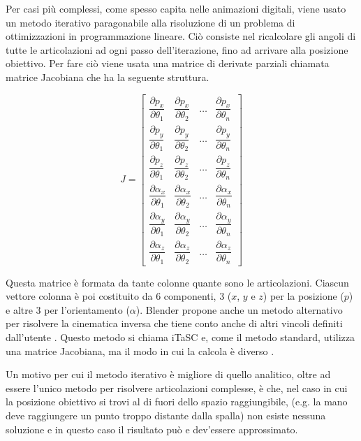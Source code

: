 Per casi più complessi, come spesso capita nelle animazioni digitali, viene usato un metodo iterativo paragonabile alla risoluzione di un problema di ottimizzazioni in programmazione lineare.
Ciò consiste nel ricalcolare gli angoli di tutte le articolazioni ad ogni passo dell'iterazione, fino ad arrivare alla posizione obiettivo.
Per fare ciò viene usata una matrice di derivate parziali chiamata matrice Jacobiana \cite{Parent:2012:CAA:2385444} che ha la seguente struttura.

\[J=
\begin{bmatrix}
    \dfrac{\partial p_x}{\partial \theta_1} & \dfrac{\partial p_x}{\partial \theta_2} & \dots & \dfrac{\partial p_x}{\partial \theta_n} \\[2ex]
    \dfrac{\partial p_y}{\partial \theta_1} & \dfrac{\partial p_y}{\partial \theta_2} & \dots & \dfrac{\partial p_y}{\partial \theta_n} \\[2ex]
    \dfrac{\partial p_z}{\partial \theta_1} & \dfrac{\partial p_z}{\partial \theta_2} & \dots & \dfrac{\partial p_z}{\partial \theta_n} \\[2ex]
    \dfrac{\partial \alpha_x}{\partial \theta_1} & \dfrac{\partial \alpha_x}{\partial \theta_2} & \dots & \dfrac{\partial \alpha_x}{\partial \theta_n} \\[2ex]
    \dfrac{\partial \alpha_y}{\partial \theta_1} & \dfrac{\partial \alpha_y}{\partial \theta_2} & \dots & \dfrac{\partial \alpha_y}{\partial \theta_n} \\[2ex]
    \dfrac{\partial \alpha_z}{\partial \theta_1} & \dfrac{\partial \alpha_z}{\partial \theta_2} & \dots & \dfrac{\partial \alpha_z}{\partial \theta_n} 
\end{bmatrix}
\]

Questa matrice è formata da tante colonne quante sono le articolazioni. Ciascun vettore colonna è poi costituito da 6 componenti, 3 ($x$, $y$ e $z$) per la posizione ($p$) e altre 3 per l'orientamento ($\alpha$).
Blender propone anche un metodo alternativo per risolvere la cinematica inversa che tiene conto anche di altri vincoli definiti dall'utente \cite{blendDoc}. Questo metodo si chiama iTaSC e, come il metodo standard, utilizza una matrice Jacobiana, ma il modo in cui la calcola è diverso \cite{blendWiki}.

Un motivo per cui il metodo iterativo è migliore di quello analitico, oltre ad essere l'unico metodo per risolvere articolazioni complesse, è che, nel caso in cui la posizione obiettivo si trovi al di fuori dello spazio raggiungibile, (e.g. la mano deve raggiungere un punto troppo distante dalla spalla) non esiste nessuna soluzione e in questo caso il risultato può e dev'essere approssimato.

